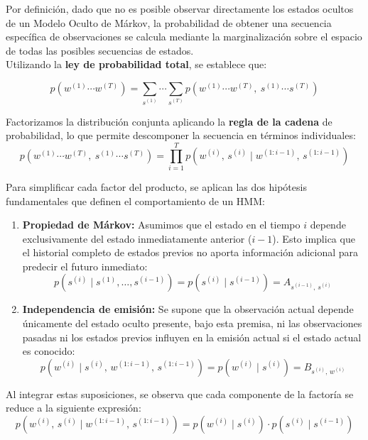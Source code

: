 Por definición, dado que no es posible observar directamente los estados ocultos de un Modelo Oculto de Márkov, la
probabilidad de obtener una secuencia específica de observaciones se calcula mediante la marginalización sobre el
espacio de todas las posibles secuencias de estados.\\
Utilizando la \textbf{ley de probabilidad total}, se establece que:

\[
p\!\left(w^{(1)} \cdots w^{(T)}\right) = \sum_{s^{(1)}} \cdots \sum_{s^{(T)}} p\!\left(w^{(1)} \cdots w^{(T)},\ s^{(1)} \cdots s^{(T)}\right)
\]

\medskip

Factorizamos la distribución conjunta aplicando la \textbf{regla de la cadena} de probabilidad, lo que permite
descomponer la secuencia en términos individuales:
\[
p\!\left(w^{(1)}\cdots w^{(T)},\ s^{(1)}\cdots s^{(T)}\right) = \prod_{i=1}^{T} p\!\left(w^{(i)},\, s^{(i)} \mid w^{(1:i-1)},\, s^{(1:i-1)}\right)
\]

\medskip

Para simplificar cada factor del producto, se aplican las dos hipótesis fundamentales que definen el
comportamiento de un HMM:

\begin{enumerate}
\item \textbf{Propiedad de Márkov:} Asumimos que el estado en el tiempo $i$ depende exclusivamente del estado
  inmediatamente anterior ($i-1$). Esto implica que el historial completo de estados previos no aporta información
  adicional para predecir el futuro inmediato:
  \[
  p\!\left(s^{(i)} \mid s^{(1)}, \ldots, s^{(i-1)}\right) = p\!\left(s^{(i)} \mid s^{(i-1)}\right) = A_{s^{(i-1)},\, s^{(i)}}
  \]

\item \textbf{Independencia de emisión:} Se supone que la observación actual depende únicamente del estado oculto
  presente, bajo esta premisa, ni las observaciones pasadas ni los estados previos influyen en la emisión actual
  si el estado actual es conocido:
  \[
  p\!\left(w^{(i)} \mid s^{(i)},\, w^{(1:i-1)},\, s^{(1:i-1)}\right) = p\!\left(w^{(i)} \mid s^{(i)}\right) = B_{s^{(i)},\, w^{(i)}}
  \]
\end{enumerate}

Al integrar estas suposiciones, se observa que cada componente de la factoría se reduce a la siguiente expresión:
\[
p\!\left(w^{(i)},\, s^{(i)} \mid w^{(1:i-1)},\, s^{(1:i-1)}\right) = p\!\left(w^{(i)} \mid s^{(i)}\right) \cdot p\!\left(s^{(i)} \mid s^{(i-1)}\right)
\]

